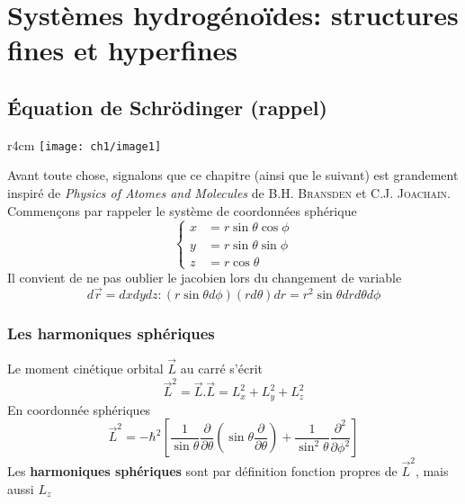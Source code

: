 \chapter{Systèmes hydrogénoïdes: structures fines et hyperfines}
\section{Équation de Schrödinger (rappel)}
	\begin{wrapfigure}[9]{r}{4cm}
	\vspace{-18mm}
	\texttt{[image: ch1/image1]}
	\end{wrapfigure}
Avant toute chose, signalons que ce chapitre (ainsi que le suivant) est grandement inspiré
de \textit{Physics of Atomes and Molecules} de \textsc{B.H. Bransden} et \textsc{C.J.
Joachain}. Commençons par rappeler le système de coordonnées sphérique
\begin{equation}
\left\{\begin{array}{ll}
x &= r\sin\theta\cos\phi\\
y &= r\sin\theta\sin\phi\\
z &= r\cos\theta
\end{array}\right.
\end{equation}
Il convient de ne pas oublier le jacobien lors du changement de variable
\begin{equation}
d\vec{r} = dxdydz : (r\sin\theta d\phi)(rd\theta)dr = r^2\sin\theta drd\theta d\phi
\end{equation}

\subsection{Les harmoniques sphériques}
Le moment cinétique orbital $\vec{L}$ au carré s'écrit
\begin{equation}
\vec{L}^2 = \vec{L}.\vec L = L^2_x+L^2_y+L^2_z
\end{equation}
En coordonnée sphériques
\begin{equation}
\vec L^2 = -\hbar^2\left[\frac{1}{\sin\theta}\frac{\partial}{\partial \theta}\left(\sin\theta\frac{\partial}{
\partial \theta}\right)+\frac{1}{\sin^2\theta}\frac{\partial^2}{\partial\phi^2}\right]
\end{equation}
Les \textbf{harmoniques sphériques} sont par définition fonction propres de $\vec{L}^2$, mais aussi $L_z$\\

\ \\

